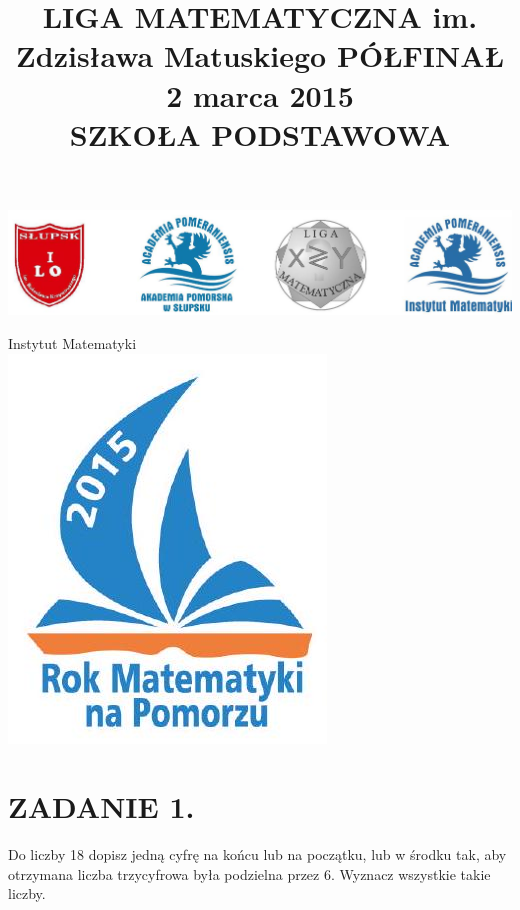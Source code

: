 \documentclass[10pt]{article}
\title{LIGA MATEMATYCZNA im. Zdzisława Matuskiego PÓŁFINAŁ 2 marca 2015 \\
 SZKOŁA PODSTAWOWA }
\author{}
\date{}
\begin{document}
\maketitle
\begin{center}
\includegraphics[max width=\textwidth]{2024_11_21_15fca1b9bbc251e5a826g-1(1)}
\end{center}

Instytut Matematyki\\
\includegraphics[max width=\textwidth, center]{2024_11_21_15fca1b9bbc251e5a826g-1}

\section*{ZADANIE 1.}
Do liczby 18 dopisz jedną cyfrę na końcu lub na początku, lub w środku tak, aby otrzymana liczba trzycyfrowa była podzielna przez 6. Wyznacz wszystkie takie liczby.
\end{document}
